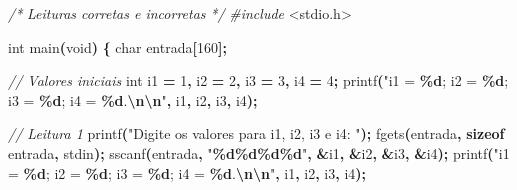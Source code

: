 \documentclass[
  11pt,
  a4paper,
]{scrbook}
\newenvironment{Shaded}{\begin{snugshade}}{\end{snugshade}}
\newcommand{\CommentTok}[1]{\textcolor[rgb]{0.56,0.35,0.01}{\textit{#1}}}
\newcommand{\DataTypeTok}[1]{\textcolor[rgb]{0.13,0.29,0.53}{#1}}
\newcommand{\DecValTok}[1]{\textcolor[rgb]{0.00,0.00,0.81}{#1}}
\newcommand{\ImportTok}[1]{#1}
\newcommand{\KeywordTok}[1]{\textcolor[rgb]{0.13,0.29,0.53}{\textbf{#1}}}
\newcommand{\NormalTok}[1]{#1}
\newcommand{\OperatorTok}[1]{\textcolor[rgb]{0.81,0.36,0.00}{\textbf{#1}}}
\newcommand{\PreprocessorTok}[1]{\textcolor[rgb]{0.56,0.35,0.01}{\textit{#1}}}
\newcommand{\SpecialCharTok}[1]{\textcolor[rgb]{0.81,0.36,0.00}{\textbf{#1}}}
\newcommand{\StringTok}[1]{\textcolor[rgb]{0.31,0.60,0.02}{#1}}
\begin{document}
\begin{Shaded}
\begin{Highlighting}[]
\CommentTok{/*}
\CommentTok{Leituras corretas e incorretas}
\CommentTok{*/}
\PreprocessorTok{\#include }\ImportTok{\textless{}stdio.h\textgreater{}}

\DataTypeTok{int}\NormalTok{ main}\OperatorTok{(}\DataTypeTok{void}\OperatorTok{)} \OperatorTok{\{}
    \DataTypeTok{char}\NormalTok{ entrada}\OperatorTok{[}\DecValTok{160}\OperatorTok{];}

    \CommentTok{// Valores iniciais}
    \DataTypeTok{int}\NormalTok{ i1 }\OperatorTok{=} \DecValTok{1}\OperatorTok{,}\NormalTok{ i2 }\OperatorTok{=} \DecValTok{2}\OperatorTok{,}\NormalTok{ i3 }\OperatorTok{=} \DecValTok{3}\OperatorTok{,}\NormalTok{ i4 }\OperatorTok{=} \DecValTok{4}\OperatorTok{;}
\NormalTok{    printf}\OperatorTok{(}\StringTok{"i1 = }\SpecialCharTok{\%d}\StringTok{; i2 = }\SpecialCharTok{\%d}\StringTok{; i3 = }\SpecialCharTok{\%d}\StringTok{; i4 = }\SpecialCharTok{\%d}\StringTok{.}\SpecialCharTok{\textbackslash{}n\textbackslash{}n}\StringTok{"}\OperatorTok{,}\NormalTok{ i1}\OperatorTok{,}\NormalTok{ i2}\OperatorTok{,}\NormalTok{ i3}\OperatorTok{,}\NormalTok{ i4}\OperatorTok{);}

    \CommentTok{// Leitura 1}
\NormalTok{    printf}\OperatorTok{(}\StringTok{"Digite os valores para i1, i2, i3 e i4: "}\OperatorTok{);}
\NormalTok{    fgets}\OperatorTok{(}\NormalTok{entrada}\OperatorTok{,} \KeywordTok{sizeof}\NormalTok{ entrada}\OperatorTok{,}\NormalTok{ stdin}\OperatorTok{);}
\NormalTok{    sscanf}\OperatorTok{(}\NormalTok{entrada}\OperatorTok{,} \StringTok{"}\SpecialCharTok{\%d\%d\%d\%d}\StringTok{"}\OperatorTok{,} \OperatorTok{\&}\NormalTok{i1}\OperatorTok{,} \OperatorTok{\&}\NormalTok{i2}\OperatorTok{,} \OperatorTok{\&}\NormalTok{i3}\OperatorTok{,} \OperatorTok{\&}\NormalTok{i4}\OperatorTok{);}
\NormalTok{    printf}\OperatorTok{(}\StringTok{"i1 = }\SpecialCharTok{\%d}\StringTok{; i2 = }\SpecialCharTok{\%d}\StringTok{; i3 = }\SpecialCharTok{\%d}\StringTok{; i4 = }\SpecialCharTok{\%d}\StringTok{.}\SpecialCharTok{\textbackslash{}n\textbackslash{}n}\StringTok{"}\OperatorTok{,}\NormalTok{ i1}\OperatorTok{,}\NormalTok{ i2}\OperatorTok{,}\NormalTok{ i3}\OperatorTok{,}\NormalTok{ i4}\OperatorTok{);}


\end{Highlighting}
\end{Shaded}
\end{document}
